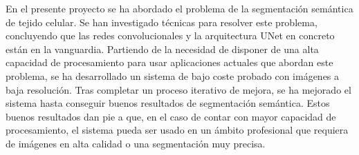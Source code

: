 
En el presente proyecto se ha abordado el problema de la segmentación semántica de tejido celular. Se han investigado técnicas para resolver este problema, concluyendo que las redes convolucionales y la arquitectura UNet en concreto están en la vanguardia. Partiendo de la necesidad de disponer de una alta capacidad de procesamiento para usar aplicaciones actuales que abordan este problema, se ha desarrollado un sistema de bajo coste probado con imágenes a baja resolución. Tras completar un proceso iterativo de mejora, se ha mejorado el sistema hasta conseguir buenos resultados de segmentación semántica. Estos buenos resultados dan pie a que, en el caso de contar con mayor capacidad de procesamiento, el sistema pueda ser usado en un ámbito profesional que requiera de imágenes en alta calidad o una segmentación muy precisa.